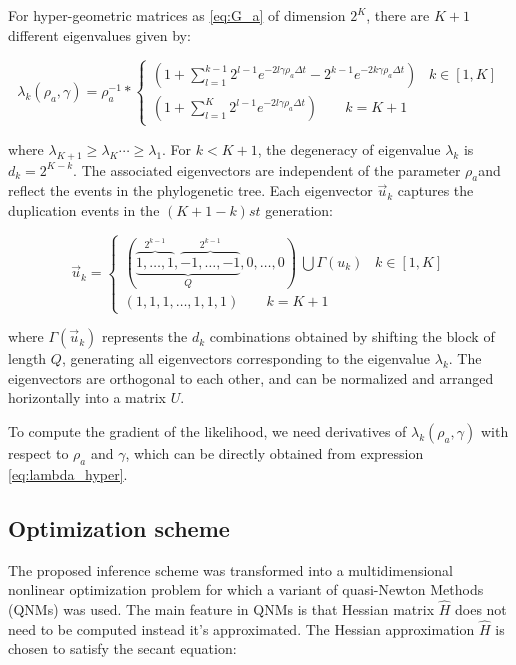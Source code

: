\documentclass[preprint,amsmath,amssymb,superscriptaddress,showpacs,pre]{revtex4-1}
\begin{document}
For hyper-geometric matrices as \eqref{eq:G_a} of dimension $2^K$, there are $K+1$ different eigenvalues  given by: 

\begin{equation}
\label{eq:lambda_hyper}
\lambda_k(\rho_a,\gamma) =\rho^{-1}_a *
\begin{cases}
 (1+\sum_{l=1}^{k-1} 2^{l-1} e ^{-2l\gamma\rho_a\Delta t}-2^{k-1} e ^{-2k\gamma\rho_a\Delta t})\;\;\; k\in[1,K] \\
 (1+\sum_{l=1}^{K} 2^{l-1} e ^{-2l\gamma\rho_a\Delta t}) \;\;\;\;\;\;\;k=K+1
\end{cases}
\end{equation}

where $\lambda_{K+1}\ge\lambda_{K}\cdots\ge\lambda_{1}$. For $k<K+1$, the degeneracy of eigenvalue $\lambda_k$ is $d_k=2^{K-k}$.  
The associated eigenvectors are independent of the parameter $\rho_a$and reflect the events in the phylogenetic tree.
Each eigenvector $\vec{u}_k$ captures the duplication events in the $(K+1 -k) st$ generation:

\begin{equation} 
\nonumber
 \vec{u}_k =
\begin{cases}
{(\underbrace{\overbrace{1,\ldots,1}^{2^{k-1}},\overbrace{-1,\ldots,-1}^{2^{k-1}}}_Q,0,\ldots,0)\ \bigcup \Gamma(u_k) } \;\;\; k\in[1,K] \\
(1,1,1,\ldots,1,1,1)\;\;\;\;\;\;\;k=K+1
\label{eq:eigenvec_simpler_case}
\end{cases}	
\end{equation}

where $\Gamma(\vec{u}_k )$ represents the $d_k$ combinations obtained by shifting the block of length $Q$, generating all eigenvectors corresponding to the eigenvalue $\lambda_k$.  The eigenvectors are orthogonal to each other, and can be  normalized and arranged horizontally into a matrix $U$. 

To compute the gradient of the likelihood, we need  derivatives of $\lambda_k(\rho_a,\gamma)$ with respect to $\rho_a$ and $\gamma$, which can be directly obtained from expression \eqref{eq:lambda_hyper}.


\subsection{Optimization scheme}
\label{sub:optimization_scheme}

The proposed inference scheme was transformed into a multidimensional nonlinear optimization problem for which a variant  of quasi-Newton Methods (QNMs) was used.  The main feature in QNMs is that Hessian matrix $\hat{H}$  does not need to be computed instead it’s approximated. The Hessian approximation $\hat{H}$ is chosen to satisfy the secant equation:
\end{document}
